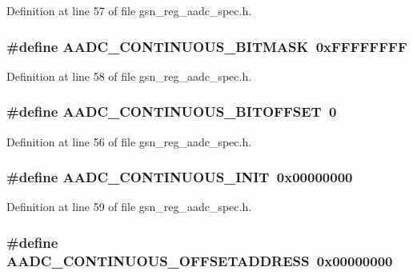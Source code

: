 Definition at line 57 of file gsn\_\-reg\_\-aadc\_\-spec.h.

\hypertarget{a00543_a622b81b6cbdf4faddfe6cb293953416b}{
\subsubsection[{AADC\_\-CONTINUOUS\_\-BITMASK}]{\setlength{\rightskip}{0pt plus 5cm}\#define AADC\_\-CONTINUOUS\_\-BITMASK~0xFFFFFFFF}}
\label{a00543_a622b81b6cbdf4faddfe6cb293953416b}


Definition at line 58 of file gsn\_\-reg\_\-aadc\_\-spec.h.

\hypertarget{a00543_a3c4eb418321e9a6388a1d5f3f3c336ee}{
\subsubsection[{AADC\_\-CONTINUOUS\_\-BITOFFSET}]{\setlength{\rightskip}{0pt plus 5cm}\#define AADC\_\-CONTINUOUS\_\-BITOFFSET~0}}
\label{a00543_a3c4eb418321e9a6388a1d5f3f3c336ee}


Definition at line 56 of file gsn\_\-reg\_\-aadc\_\-spec.h.

\hypertarget{a00543_a2464f6380ebc0317b703afb45cda8bfd}{
\subsubsection[{AADC\_\-CONTINUOUS\_\-INIT}]{\setlength{\rightskip}{0pt plus 5cm}\#define AADC\_\-CONTINUOUS\_\-INIT~0x00000000}}
\label{a00543_a2464f6380ebc0317b703afb45cda8bfd}


Definition at line 59 of file gsn\_\-reg\_\-aadc\_\-spec.h.

\hypertarget{a00543_a24c16b6e875b66484cec1aae79fed677}{
\subsubsection[{AADC\_\-CONTINUOUS\_\-OFFSETADDRESS}]{\setlength{\rightskip}{0pt plus 5cm}\#define AADC\_\-CONTINUOUS\_\-OFFSETADDRESS~0x00000000}}
\label{a00543_a24c16b6e875b66484cec1aae79fed677}


